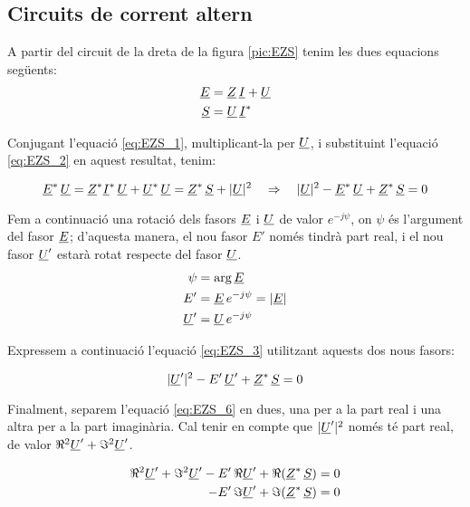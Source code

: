 \subsection{Circuits de corrent altern}

A partir del circuit de la dreta de la figura \vref{pic:EZS} tenim les dues equacions següents:
\begin{align}
   \underline{E} &= \underline{Z} \, \underline{I} + \underline{U} \label{eq:EZS_1} \\
   \underline{S} &= \underline{U} \, \underline{I}^*           \label{eq:EZS_2}
\end{align}

Conjugant l'equació \eqref{eq:EZS_1}, multiplicant-la per $\underline{U}$, i substituint l'equació \eqref{eq:EZS_2} en aquest resultat, tenim:

\begin{equation}
   \underline{E}^* \, \underline{U} = \underline{Z}^* \underline{I}^* \, \underline{U} + \underline{U}^* \, \underline{U} =
   \underline{Z}^* \, \underline{S} + |\underline{U}|^2 \quad \Rightarrow \quad
   |\underline{U}|^2 - \underline{E}^* \, \underline{U} + \underline{Z}^* \, \underline{S} = 0
   \label{eq:EZS_3}
\end{equation}

Fem a continuació una rotació dels fasors $\underline{E}$ i
$\underline{U}$ de valor $e^{-j\psi}$, on $\psi$ és l'argument
del fasor $\underline{E}$; d'aquesta manera, el nou fasor $E'$ només tindrà part real, i el nou fasor $\underline{U}'$ estarà rotat
respecte del fasor $\underline{U}$.
\begin{align}
   \psi &= \arg\underline{E} \label{eq:EZS_9} \\
   E' &= \underline{E} \, e^{-j\psi} = |\underline{E}|  \label{eq:EZS_4} \\
   \underline{U}' &= \underline{U} \, e^{-j\psi}   \label{eq:EZS_5}
\end{align}

Expressem a continuació l'equació \eqref{eq:EZS_3} utilitzant
aquests dos nous fasors:

\begin{equation}
   |\underline{U}'|^2 - E' \, \underline{U}' + \underline{Z}^* \, \underline{S} = 0 \label{eq:EZS_6}
\end{equation}

Finalment, separem l'equació \eqref{eq:EZS_6} en dues, una per a la part real i una altra per a la part imaginària. Cal tenir en compte que $|\underline{U}'|^2$ només té part real, de valor $\Re^2\underline{U}' + \Im^2\underline{U}'$.

\begin{align}
   \Re^2\underline{U}' + \Im^2\underline{U}' - E' \, \Re\underline{U}' + \Re(\underline{Z}^* \, \underline{S}) &= 0 \label{eq:EZS_7} \\
   - E' \, \Im\underline{U}' + \Im(\underline{Z}^* \, \underline{S}) &= 0 \label{eq:EZS_8}
\end{align}

